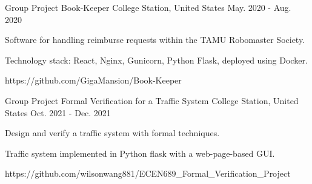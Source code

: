\begin{cventries}
    \cventry
    {Group Project}
    {Book-Keeper}
    {College Station, United States}
    {May. 2020 - Aug. 2020}
    {
        \begin{cvitems}
            \item Software for handling reimburse requests within the TAMU Robomaster Society.
            \item Technology stack: React, Nginx, Gunicorn, Python Flask, deployed using Docker.
            \item https://github.com/GigaMansion/Book-Keeper
        \end{cvitems}
    }
    
    \cventry
    {Group Project}
    {Formal Verification for a Traffic System}
    {College Station, United States}
    {Oct. 2021 - Dec. 2021}
    {
        \begin{cvitems}
            \item Design and verify a traffic system with formal techniques.
            \item Traffic system implemented in Python flask with a web-page-based GUI.
            \item https://github.com/wilsonwang881/ECEN689\_Formal\_Verification\_Project
        \end{cvitems}
    }

\end{cventries}